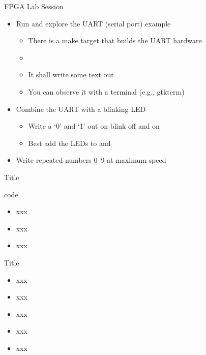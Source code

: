 \begin{frame}[fragile]{FPGA Lab Session}
\begin{itemize}
\item Run and explore the UART (serial port) example
\begin{itemize}
\item There is a make target that builds the UART hardware
\item {}
\item It shall write some text out
\item You can observe it with a terminal (e.g., gtkterm)
\end{itemize}
\item Combine the UART with a blinking LED
\begin{itemize}
\item Write a `0' and `1' out on blink off and on
\item Best add the LEDs to  and 
\end{itemize}
\item Write repeated numbers 0--9 at maximum speed 
\end{itemize}
\end{frame}



\begin{frame}[fragile]{Title}
\begin{chisel}
code
\end{chisel}
\begin{itemize}
\item xxx
\item xxx
\item xxx
\end{itemize}
\end{frame}

\begin{frame}[fragile]{Title}
\begin{itemize}
\item xxx
\item xxx
\item xxx
\item xxx
\item xxx
\end{itemize}
\end{frame}

